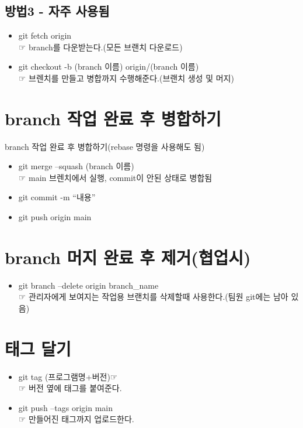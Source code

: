 \documentclass[12pt,a4paper]{oblivoir}
\begin{document}
\subsection{방법3 - 자주 사용됨}
\begin{itemize}
\item git fetch origin \\  ☞ branch를 다운받는다.(모든 브랜치 다운로드)
\item git checkout -b (branch 이름) origin/(branch 이름) \\  ☞ 브렌치를 만들고 병합까지 수행해준다.(브랜치 생성 및 머지)
\end{itemize}
\section[branch 작업 완료 후 병합하기]{branch 작업 완료 후 병합하기}
branch 작업 완료 후 병합하기(rebase 명령을 사용해도 됨)
\begin{itemize}
\item git merge --squash (branch 이름) \\  ☞ main 브렌치에서 실행, commit이 안된 상태로 병합됨
\item git commit -m ``내용''
\item git push origin main
\end{itemize}

\section[branch 머지 완료 후 제거(협업시)]{branch 머지 완료 후 제거(협업시)}
\begin{itemize}
\item git branch --delete origin branch\_name \\  ☞ 관리자에게 보여지는 작업용 브랜치를 삭제할때 사용한다.(팀원 git에는 남아 있음)
\end{itemize}

\section[태그 달기]{태그 달기}
\begin{itemize}
\item git tag (프로그램명+버전)☞ \\  ☞ 버전 옆에 태그를 붙여준다.
\item git push --tags origin main  \\  ☞ 만들어진 태그까지 업로드한다.
\end{itemize}
\end{document}

